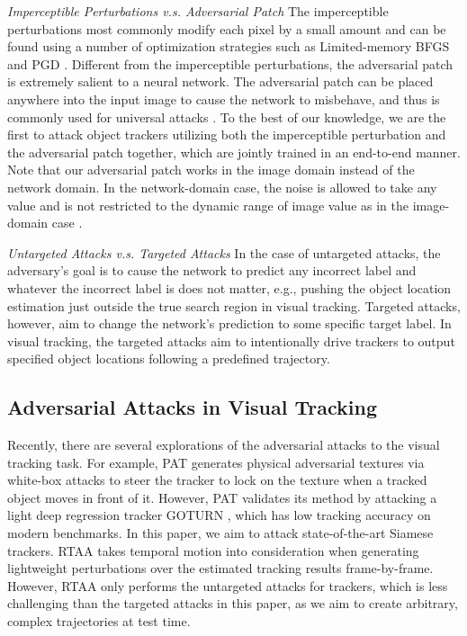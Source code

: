 \documentclass[journal]{IEEEtran}
\newcommand{\eg}{e.g.}
\begin{document}
\textit{Imperceptible Perturbations v.s. Adversarial Patch} The imperceptible perturbations most commonly modify each pixel by a small amount and can be found using a number of optimization strategies such as Limited-memory BFGS \cite{intriguing} and PGD \cite{PGD}.
Different from the imperceptible perturbations, the adversarial patch is extremely salient to a neural network. The adversarial patch can be placed anywhere into the input image to cause the network to misbehave, and thus is commonly used for universal attacks \cite{patch}.
To the best of our knowledge, we are the first to attack object trackers utilizing both the imperceptible perturbation and the adversarial patch together, which are jointly trained in an end-to-end manner.
Note that our adversarial patch works in the image domain instead of the network domain. In the network-domain case, the noise is allowed to take any value and is not restricted to the dynamic range of image value as in the image-domain case \cite{karmon2018lavan}.

\textit{Untargeted Attacks v.s. Targeted Attacks} In the case of untargeted attacks, the adversary's goal is to cause the network to predict any incorrect label and whatever the incorrect label is does not matter, \eg, pushing the object location estimation just outside the true search region in visual tracking.
Targeted attacks, however, aim to change the network's prediction to some specific target label. In visual tracking, the targeted attacks aim to intentionally drive trackers to output specified object locations following a predefined trajectory.

\subsection{Adversarial Attacks in Visual Tracking}

Recently, there are several explorations of the adversarial attacks to the visual tracking task. For example, PAT \cite{PAT} generates physical adversarial textures via white-box attacks to steer the tracker to lock on the texture when a tracked object moves in front of it. However, PAT validates its method by attacking a light deep regression tracker GOTURN \cite{GOTURN}, which has low tracking accuracy on modern benchmarks. In this paper, we aim to attack state-of-the-art Siamese trackers.
RTAA \cite{RTAA} takes temporal motion into consideration when generating lightweight perturbations over the estimated tracking results frame-by-frame. However, RTAA only performs the untargeted attacks for trackers, which is less challenging than the targeted attacks in this paper, as we aim to create arbitrary, complex trajectories at test time. 
\end{document}
